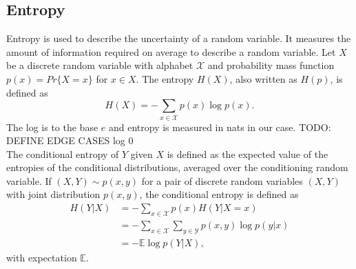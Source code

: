 \subsection{Entropy}

Entropy is used to describe the uncertainty of a random variable. It measures the amount of information required on average to describe a random variable. Let $X$ be a discrete random variable with alphabet $\mathcal{X}$ and probability mass function $p(x)=Pr\{X=x\}$ for $x\in X$.
The entropy $H(X)$, also written as $H(p)$, is defined as
\begin{equation}
    H(X) = -\sum_{x \in \mathcal{X}} p(x) \log p(x).
\end{equation}
The log is to the base $e$ and entropy is measured in nats in our case. TODO: DEFINE EDGE CASES log 0 %
\\
The conditional entropy of $Y$ given $X$ is defined as the expected value of the entropies of the conditional distributions, averaged over the conditioning random variable. If $(X,Y) \sim p(x,y)$ for a pair of discrete random variables $(X,Y)$ with joint distribution $p(x,y)$, the conditional entropy is defined as
\begin{align}
    H(Y|X)&= -\sum_{x \in \mathcal{X}} p(x) H(Y|X=x) \\
    &= - \sum_{x \in \mathcal{X}} \sum_{y \in \mathcal{Y}}p(x,y) \log p(y|x) \\
    &= -\mathbb{E} \log p(Y|X),
\end{align}
with expectation $\mathbb{E}$.

